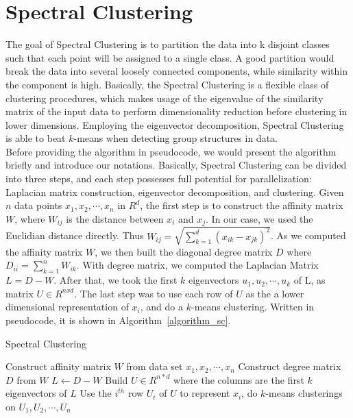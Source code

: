 \documentclass{acm_proc_article-sp}
\begin{document}
\section{Spectral Clustering}
The goal of Spectral Clustering is to partition the data into k disjoint classes such that each point will be assigned to a single class. A good partition would break the data into several loosely connected components, while similarity within the component is high.
Basically, the Spectral Clustering is a flexible class of clustering procedures, which makes usage of the eigenvalue of the similarity matrix of the input data to perform dimensionality reduction before clustering in lower dimensions. Employing the eigenvector decomposition, Spectral Clustering is able to beat $k$-means when detecting group structures in data.\\
Before providing the algorithm in pseudocode, we would present the algorithm briefly and introduce our notations. Basically, Spectral Clustering can be divided into three steps, and each step possesses full potential for parallelization: Laplacian matrix construction, eigenvector decomposition, and clustering. Given $n$ data points $x_1, x_2, \cdots, x_n$ in $R^d$, the first step is to construct the affinity matrix $W$, where $W_{ij}$ is the distance between $x_i$ and $x_j$. In our case, we used the Euclidian distance directly. Thus $W_{ij} = \sqrt{\sum_{k=1}^d(x_{ik} - x_{jk})^2}$. As we computed the affinity matrix $W$, we then built the diagonal degree matrix $D$ where $D_{ii} = \sum_{k=1}^nW_{ik}$. With degree matrix, we computed the Laplacian Matrix $L = D - W$. After that, we took the first $k$ eigenvectors $u_1, u_2, \cdots, u_k$ of L, as matrix $U \in R^{nxd}$. The last step was to use each row of $U$ as the a lower dimensional representation of $x_i$, and do a $k$-means clustering. 
Written in pseudocode, it is shown in Algorithm~\ref{algorithm_sc}.
\begin{algorithm}
\caption{Spectral Clustering}
\label{CHalgorithm}
\begin{algorithmic}[1]
\State Construct affinity matrix $W$ from data set $x_1, x_2, \cdots, x_n$
\State Construct degree matrix $D$ from $W$
\State $L \leftarrow D - W$
\State Build $U \in R^{n*d}$ where the columns are the first $k$ eigenvectors of $L$ 
\State Use the $i^{th}$ row $U_i$ of $U$ to represent $x_i$, do $k$-means clusterings on $U_1, U_2, \cdots, U_n$
\end{algorithmic}
\label{algorithm_sc}
\end{algorithm}
\end{document}
